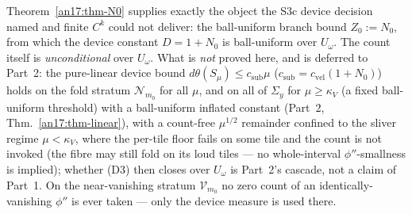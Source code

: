 \begin{remark}\label{an17:rem-defer}
Theorem~\ref{an17:thm-N0} supplies exactly the object the S3c device decision
named and finite $C^k$ could not deliver: the ball-uniform branch bound
$Z_0:=N_0$, from which the device constant $D=1+N_0$ is ball-uniform over
$U_\omega$. The count itself is \emph{unconditional} over $U_\omega$. What is
\emph{not} proved here, and is deferred to Part~2: the pure-linear device bound
$d\theta(S_\mu)\le c_{\mathrm{sub}}\mu$ ($c_{\mathrm{sub}}=c_{\mathrm{vel}}(1+N_0)$)
holds on the fold stratum $\mathcal N_{m_0}$ for all $\mu$, and on all of
$\Sigma_y$ for $\mu\ge\kappa_V$ (a fixed ball-uniform threshold) with a
ball-uniform inflated constant (Part~2, Thm.~\ref{an17:thm-linear}), with a
count-free $\mu^{1/2}$ remainder confined to the sliver regime $\mu<\kappa_V$,
where the per-tile floor fails on some tile and the count is not invoked (the
fibre may still fold on its loud tiles --- no whole-interval
$\phi''$-smallness is implied); whether (D3) then closes over $U_\omega$ is Part~2's cascade, not a
claim of Part~1. On the near-vanishing stratum $\mathcal V_{m_0}$ no zero count of
an identically-vanishing $\phi''$ is ever taken --- only the device measure is
used there.
\end{remark}


